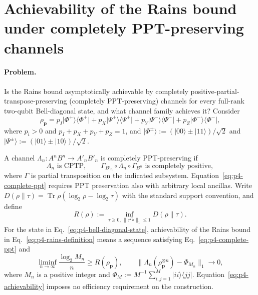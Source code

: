 \section{Achievability of the Rains bound under completely PPT-preserving channels}
\label{sec:op_4cf3e7b8663b1d41}

\paragraph{Problem.}
Is the Rains bound asymptotically achievable by completely
positive-partial-transpose-preserving (completely PPT-preserving) channels
for every full-rank two-qubit Bell-diagonal state, and what channel family
achieves it? Consider
\begin{equation}
  \rho_{\mathbf p}
  =p_I\lvert\Phi^+\rangle\!\langle\Phi^+\rvert
  +p_X\lvert\Psi^+\rangle\!\langle\Psi^+\rvert
  +p_Y\lvert\Psi^-\rangle\!\langle\Psi^-\rvert
  +p_Z\lvert\Phi^-\rangle\!\langle\Phi^-\rvert,
  \label{eq:p4-bell-diagonal-state}
\end{equation}
where $p_i>0$ and $p_I+p_X+p_Y+p_Z=1$, and
$\lvert\Phi^\pm\rangle:=(\lvert00\rangle\pm\lvert11\rangle)/\sqrt2$ and
$\lvert\Psi^\pm\rangle:=(\lvert01\rangle\pm\lvert10\rangle)/\sqrt2$.

A channel $\Lambda_n:A^nB^n\to A'_nB'_n$ is completely PPT-preserving if
\begin{equation}
  \Lambda_n\text{ is CPTP},\qquad
  \Gamma_{B'_n}\circ\Lambda_n\circ\Gamma_{B^n}
     \text{ is completely positive},
  \label{eq:p4-complete-ppt}
\end{equation}
where $\Gamma$ is partial transposition on the indicated subsystem.
Equation~\eqref{eq:p4-complete-ppt} requires PPT preservation also with
arbitrary local ancillas.
Write $D(\rho\|\tau)=\operatorname{Tr}\rho(\log_2\rho-\log_2\tau)$
with the standard support convention, and define
\begin{equation}
  R(\rho):=\inf_{\tau\geq0,\,\|\tau^{\Gamma_B}\|_1\leq1}
                  D(\rho\|\tau).
  \label{eq:p4-rains-definition}
\end{equation}
For the state in Eq.~\eqref{eq:p4-bell-diagonal-state}, achievability of
the Rains bound in Eq.~\eqref{eq:p4-rains-definition} means a sequence satisfying Eq.~\eqref{eq:p4-complete-ppt} and
\begin{equation}
  \liminf_{n\to\infty}\frac{\log_2 M_n}{n}
      \geq R(\rho_{\mathbf p}),\qquad
  \big\|\Lambda_n(\rho_{\mathbf p}^{\otimes n})
             -\Phi_{M_n}\big\|_1\longrightarrow0,
  \label{eq:p4-achievability}
\end{equation}
where $M_n$ is a positive integer and
$\Phi_M:=M^{-1}\sum_{i,j=1}^M|ii\rangle\langle jj|$.
Equation~\eqref{eq:p4-achievability} imposes no efficiency requirement on
the construction.

